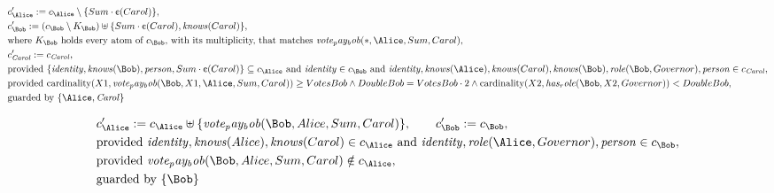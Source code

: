 \begin{align*}
&
c'_
{
\Alice
}
 := 
c_
{
\Alice
}
 \setminus 
\{
Sum
\cdot
\text{\textcent}
(
Carol
)
\}
,\\
&
c'_
{
\Bob
}
 := 
(
c_
{
\Bob
}
 \setminus K_
{
\Bob
}
) \uplus 
\{
Sum
\cdot
\text{\textcent}
(
Carol
)
,
\mathit{
knows
}
(
Carol
)
\}
,\\
&
\text{where } K_
{
\Bob
}
 \text{ holds every atom of } c_
{
\Bob
}
 \text{, with its multiplicity, that matches } 
\mathit{
vote_pay_bob
}
(
\ast
,
\Alice
,
Sum
,
Carol
)
,\\
&
c'_
{
\mathit{Carol}
}
 := 
c_
{
\mathit{Carol}
}
,\\
&
\text{provided } 
\{
\mathit{
identity
}
,
\mathit{
knows
}
(
\Bob
)
,
\mathit{
person
}
,
Sum
\cdot
\text{\textcent}
(
Carol
)
\}
 \subseteq c_
{
\Alice
}
 \text{ and } 
\mathit{
identity
}
 \in c_
{
\Bob
}
 \text{ and } 
\mathit{
identity
}
,
\mathit{
knows
}
(
\Alice
)
,
\mathit{
knows
}
(
Carol
)
,
\mathit{
knows
}
(
\Bob
)
,
\mathit{
role
}
(
\Bob
,
Governor
)
,
\mathit{
person
}
 \in c_
{
\mathit{Carol}
}
,\\
&
\text{provided } 
\mathrm{cardinality}(
X1
,
\mathit{
vote_pay_bob
}
(
\Bob
,
X1
,
\Alice
,
Sum
,
Carol
)
)
\ge
VotesBob
\land
DoubleBob
=
VotesBob
\cdot
2
\land
\mathrm{cardinality}(
X2
,
\mathit{
has_role
}
(
\Bob
,
X2
,
Governor
)
)
<
DoubleBob
,\\
&
\text{guarded by } \{
\Alice
,
\mathit{Carol}
\}
\end{align*}

\begin{align*}
&
c'_
{
\Alice
}
 := 
c_
{
\Alice
}
 \uplus 
\{
\mathit{
vote_pay_bob
}
(
\Bob
,
Alice
,
Sum
,
Carol
)
\}
, \qquad 
c'_
{
\Bob
}
 := 
c_
{
\Bob
}
,\\
&
\text{provided } 
\mathit{
identity
}
,
\mathit{
knows
}
(
Alice
)
,
\mathit{
knows
}
(
Carol
)
 \in c_
{
\Alice
}
 \text{ and } 
\mathit{
identity
}
,
\mathit{
role
}
(
\Alice
,
Governor
)
,
\mathit{
person
}
 \in c_
{
\Bob
}
,\\
&
\text{provided } 
\mathit{
vote_pay_bob
}
(
\Bob
,
Alice
,
Sum
,
Carol
)
 \notin c_
{
\Alice
}
,\\
&
\text{guarded by } \{
\Bob
\}
\end{align*}

